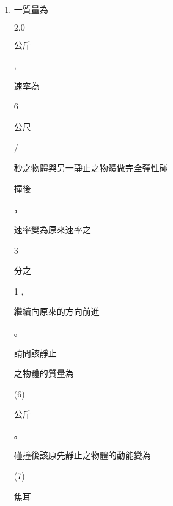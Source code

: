 \documentclass[10pt]{article}
\begin{document}
\begin{enumerate}
  \item \begin{CJK}{UTF8}{mj}一質量為\end{CJK} $2.0$ \begin{CJK}{UTF8}{mj}公斤\end{CJK} , \begin{CJK}{UTF8}{mj}速率為\end{CJK} 6 \begin{CJK}{UTF8}{mj}公尺\end{CJK}/\begin{CJK}{UTF8}{mj}秒之物體與另一靜止之物體做完全彈性碰\end{CJK} \begin{CJK}{UTF8}{mj}撞後\end{CJK}，\begin{CJK}{UTF8}{mj}速率變為原來速率之\end{CJK} 3 \begin{CJK}{UTF8}{mj}分之\end{CJK} 1 , \begin{CJK}{UTF8}{mj}繼續向原來的方向前進\end{CJK}。\begin{CJK}{UTF8}{mj}請問該靜止\end{CJK} \begin{CJK}{UTF8}{mj}之物體的質量為\end{CJK} (6) \begin{CJK}{UTF8}{mj}公斤\end{CJK} 。\begin{CJK}{UTF8}{mj}碰撞後該原先靜止之物體的動能變為\end{CJK} (7) \begin{CJK}{UTF8}{mj}焦耳\end{CJK}


\end{enumerate}
\end{document}
